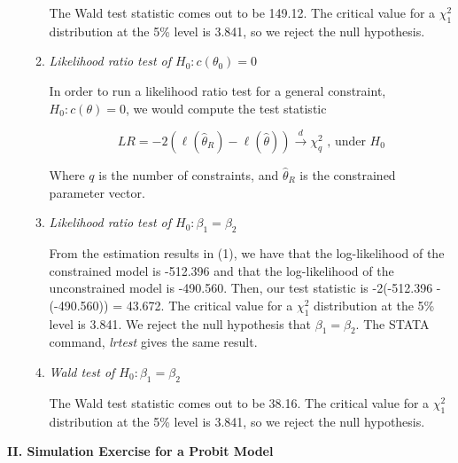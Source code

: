 \documentclass{article}
\begin{document}
\begin{enumerate}
\begin{enumerate}
The Wald test statistic comes out to be 149.12. The critical value for a $\chi_1^2$ distribution at the 5\% level is 3.841, so we reject the null hypothesis.

\item \textit{Likelihood ratio test of $H_0: c(\theta_0) = 0$}

In order to run a likelihood ratio test for a general constraint, $H_0: c(\theta) = 0$, we would compute the test statistic

\[ LR = -2 (\ell(\hat{\theta}_R) - \ell(\hat{\theta})) \stackrel{d}{\to} \chi_q^2 \text{ , under } H_0\]

Where $q$ is the number of constraints, and $\hat{\theta}_R$ is the constrained parameter vector.

\item \textit{Likelihood ratio test of $H_0: \beta_1 = \beta_2$}

From the estimation results in (1), we have that the log-likelihood of the constrained model is -512.396 and that the log-likelihood of the unconstrained model is -490.560. Then, our test statistic is -2(-512.396 - (-490.560)) = 43.672. The critical value for a $\chi_1^2$ distribution at the 5\% level is 3.841. We reject the null hypothesis that $\beta_1 = \beta_2$. The STATA command, \textit{lrtest} gives the same result.

\item \textit{Wald test of $H_0: \beta_1 = \beta_2$}

The Wald test statistic comes out to be 38.16. The critical value for a $\chi_1^2$ distribution at the 5\% level is 3.841, so we reject the null hypothesis.

\end{enumerate}

\end{enumerate}

\textbf{II. Simulation Exercise for a Probit Model}\\
\end{document}
